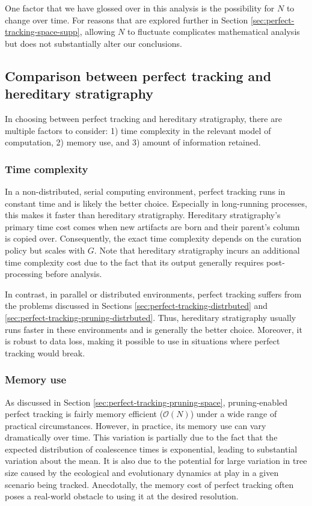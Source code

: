 One factor that we have glossed over in this analysis is the possibility for $N$ to change over time.
For reasons that are explored further in Section \ref{sec:perfect-tracking-space-supp}, allowing $N$ to fluctuate complicates mathematical analysis but does not substantially alter our conclusions.

\subsection{Comparison between perfect tracking and hereditary stratigraphy}

In choosing between perfect tracking and hereditary stratigraphy, there are multiple factors to consider: 1) time complexity in the relevant model of computation, 2) memory use, and 3) amount of information retained.

\subsubsection{Time complexity}

In a non-distributed, serial computing environment, perfect tracking runs in constant time and is likely the better choice. 
Especially in long-running processes, this makes it faster than hereditary stratigraphy.
Hereditary stratigraphy's primary time cost comes when new artifacts are born and their parent's column is copied over.
Consequently, the exact time complexity depends on the curation policy but scales with $G$.
Note that hereditary stratigraphy incurs an additional time complexity cost due to the fact that its output generally requires post-processing before analysis.

In contrast, in parallel or distributed environments, perfect tracking suffers from the problems discussed in Sections \ref{sec:perfect-tracking-distrbuted} and \ref{sec:perfect-tracking-pruning-distrbuted}.
Thus, hereditary stratigraphy usually runs faster in these environments and is generally the better choice.
Moreover, it is robust to data loss, making it possible to use in situations where perfect tracking would break.

\subsubsection{Memory use}

As discussed in Section \ref{sec:perfect-tracking-pruning-space}, pruning-enabled perfect tracking is fairly memory efficient ($\mathcal{O}(N)$) under a wide range of practical circumstances.
However, in practice, its memory use can vary dramatically over time.
This variation is partially due to the fact that the expected distribution of coalescence times is exponential, leading to substantial variation about the mean.
It is also due to the potential for large variation in tree size caused by the ecological and evolutionary dynamics at play in a given scenario being tracked.
Anecdotally, the memory cost of perfect tracking often poses a real-world obstacle to using it at the desired resolution.

